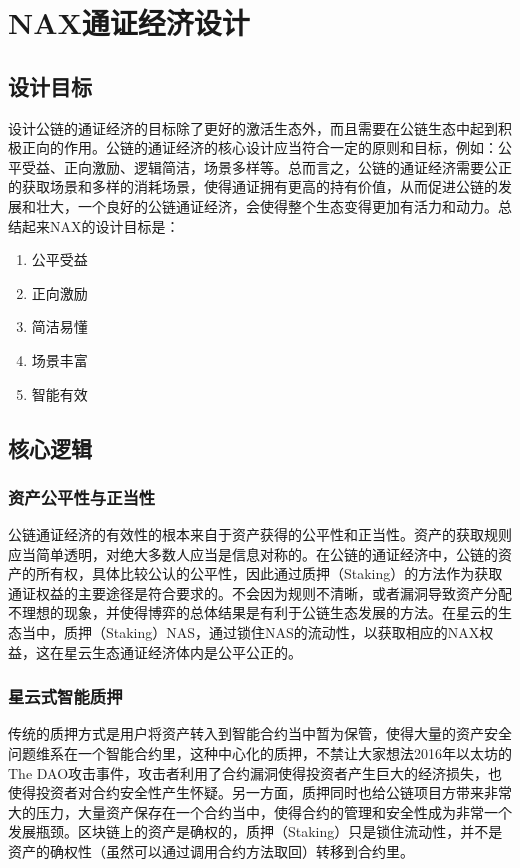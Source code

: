 \section{NAX通证经济设计}
\subsection{设计目标}
设计公链的通证经济的目标除了更好的激活生态外，而且需要在公链生态中起到积极正向的作用。公链的通证经济的核心设计应当符合一定的原则和目标，例如：公平受益、正向激励、逻辑简洁，场景多样等。总而言之，公链的通证经济需要公正的获取场景和多样的消耗场景，使得通证拥有更高的持有价值，从而促进公链的发展和壮大，一个良好的公链通证经济，会使得整个生态变得更加有活力和动力。总结起来NAX的设计目标是：

\begin{enumerate}[\hspace{2cm}(a)]
    \item 公平受益
    \item 正向激励
    \item 简洁易懂
    \item 场景丰富
    \item 智能有效
\end{enumerate}

\subsection{核心逻辑}

\subsubsection{资产公平性与正当性}
公链通证经济的有效性的根本来自于资产获得的公平性和正当性。资产的获取规则应当简单透明，对绝大多数人应当是信息对称的。在公链的通证经济中，公链的资产的所有权，具体比较公认的公平性，因此通过质押（Staking）的方法作为获取通证权益的主要途径是符合要求的。不会因为规则不清晰，或者漏洞导致资产分配不理想的现象，并使得博弈的总体结果是有利于公链生态发展的方法。在星云的生态当中，质押（Staking）NAS，通过锁住NAS的流动性，以获取相应的NAX权益，这在星云生态通证经济体内是公平公正的。

\subsubsection{星云式智能质押}
传统的质押方式是用户将资产转入到智能合约当中暂为保管，使得大量的资产安全问题维系在一个智能合约里，这种中心化的质押，不禁让大家想法2016年以太坊的The DAO攻击事件，攻击者利用了合约漏洞使得投资者产生巨大的经济损失，也使得投资者对合约安全性产生怀疑。另一方面，质押同时也给公链项目方带来非常大的压力，大量资产保存在一个合约当中，使得合约的管理和安全性成为非常一个发展瓶颈。区块链上的资产是确权的，质押（Staking）只是锁住流动性，并不是资产的确权性（虽然可以通过调用合约方法取回）转移到合约里。

